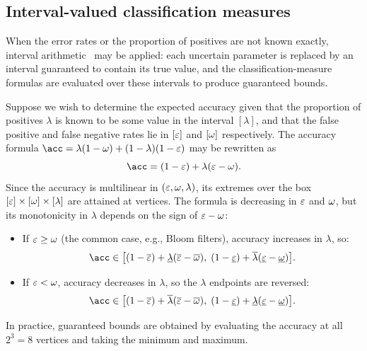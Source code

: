 \subsection{Interval-valued classification measures}
\label{sec:interval_measures}
When the error rates or the proportion of positives are not known exactly, interval arithmetic~\cite{bernoulliComposition,basicinterval,mooreInterval} may be applied: each uncertain parameter is replaced by an interval guaranteed to contain its true value, and the classification-measure formulas are evaluated over these intervals to produce guaranteed bounds.

\begin{example}
\label{ex:interval_accuracy}
	Suppose we wish to determine the expected accuracy given that the proportion of positives $\lambda$ is known to be some value in the interval $[\lambda]$, and that the false positive and false negative rates lie in $[\varepsilon]$ and $[\omega]$ respectively.
	The accuracy formula $\acc = \lambda(1-\fnrate) + (1-\lambda)(1-\fprate)$ may be rewritten as
	\begin{equation}
		\acc = (1-\fprate) + \lambda(\fprate - \fnrate).
	\end{equation}
	Since the accuracy is multilinear in $(\varepsilon, \omega, \lambda)$, its extremes over the box $[\varepsilon] \times [\omega] \times [\lambda]$ are attained at vertices.
	The formula is decreasing in $\varepsilon$ and $\omega$, but its monotonicity in $\lambda$ depends on the sign of $\varepsilon - \omega$:
	\begin{itemize}
		\item If $\varepsilon \geq \omega$ (the common case, e.g., Bloom filters), accuracy increases in $\lambda$, so:
		\begin{equation}
			\acc \in \bigl[
			(1-\overline{\fprate}) + \underline{\lambda}(\overline{\fprate} - \overline{\fnrate}),\;
			(1-\underline{\fprate}) + \overline{\lambda}(\underline{\fprate} - \underline{\fnrate})
			\bigr].
		\end{equation}
		\item If $\varepsilon < \omega$, accuracy decreases in $\lambda$, so the $\lambda$ endpoints are reversed:
		\begin{equation}
			\acc \in \bigl[
			(1-\overline{\fprate}) + \overline{\lambda}(\overline{\fprate} - \overline{\fnrate}),\;
			(1-\underline{\fprate}) + \underline{\lambda}(\underline{\fprate} - \underline{\fnrate})
			\bigr].
		\end{equation}
	\end{itemize}
	In practice, guaranteed bounds are obtained by evaluating the accuracy at all $2^3 = 8$ vertices and taking the minimum and maximum.
\end{example}

